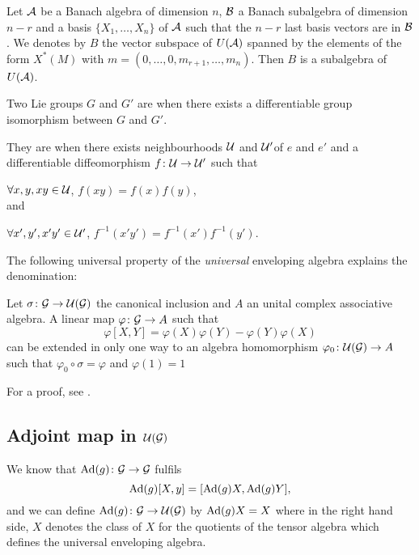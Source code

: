 \begin{corollary} \label{cor:/24}
    Let $\mathcal{A}$ be a Banach algebra of dimension $n$, $\mathcal{B}$ a Banach subalgebra of dimension $n-r$ and a basis $\{X_1,\ldots,X_n\}$ of $\mathcal{A}$ such that the $n-r$ last basis vectors are in $\mathcal{B}$. We denotes by $B$ the vector subspace of $U(\mathcal{A})$ spanned by the elements of the form $X^*(M)$ with $m=(0,\ldots,0,m_{r+1},\ldots,m_n)$. Then $B$ is a subalgebra of $U(\mathcal{A})$.
\end{corollary}

\begin{definition}
Two Lie groups $G$ and $G'$ are  when there exists a differentiable group isomorphism between $G$ and $G'$.

They are  when there exists neighbourhoods $\mathcal{U}$ and $\mathcal{U}'$of $e$ and $e'$ and a differentiable diffeomorphism $f\colon \mathcal{U}\to \mathcal{U}'$ such that

$\forall x,y,xy\in\mathcal{U}$, $f(xy)=f(x)f(y)$, \\and

$\forall x',y',x'y'\in\mathcal{U}'$, $f^{-1}(x'y')=f^{-1}(x')f^{-1}(y')$.
\end{definition}

The following universal property of the \emph{universal} enveloping algebra explains the denomination:
\begin{proposition}
Let $\sigma\colon \mathcal{G}\to \mathcal{U}(\mathcal{G})$ the canonical inclusion and $A$ an unital complex associative algebra. A linear map $\varphi\colon \mathcal{G}\to A$ such that
\begin{equation}
\varphi[X,Y]=\varphi(X)\varphi(Y)-\varphi(Y)\varphi(X)
\end{equation}
can be extended in only one way to an algebra homomorphism $\varphi_0\colon \mathcal{U}(\mathcal{G})\to A$ such that $\varphi_0\circ\sigma=\varphi$ and $\varphi(1)=1$
\label{prop:extunifmap}
\end{proposition}
For a proof, see \cite{Knapp_reprez}.

\subsection{Adjoint map in \texorpdfstring{$\mathcal{U}(\mathcal{G})$}{U(G)}}   \label{ssadjunif}

We know that $\operatorname{Ad}(g) \colon  \mathcal{G} \to  \mathcal{G}$ fulfils
\[ 
  \operatorname{Ad}(g)[X,y]=[  \operatorname{Ad}(g)X,\operatorname{Ad}(g)Y  ],
\]
and we can define $\operatorname{Ad}(g) \colon  \mathcal{G} \to  \mathcal{U}(\mathcal{G})$ by $\operatorname{Ad}(g)X=X$ where in the right hand side, $X$ denotes the class of $X$ for the quotients of the tensor algebra which defines the universal enveloping algebra.

